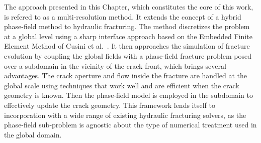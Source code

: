 

The approach presented in this Chapter, which constitutes the core of this work, is refered to as a multi-resolution method. It extends the concept of a hybrid phase-field method \cite{giovanardi2017hybrid, geelen2018optimization, muixi2021combined} to hydraulic fracturing. The method discretizes the problem at a global level using a sharp interface approach based on the Embedded Finite Element Method of Cusini et al.\ \cite{cusini2021simulation}.  It then approaches the simulation of fracture evolution by coupling the global fields with a phase-field fracture problem posed over a subdomain in the vicinity of the crack front, which brings several advantages. The crack aperture and flow inside the fracture are handled at the global scale using techniques that work well and are efficient when the crack geometry is known. Then the phase-field model is employed in the subdomain to effectively update the crack geometry. This framework lends itself to incorporation with a wide range of existing hydraulic fracturing solvers, as the phase-field sub-problem is agnostic about the type of numerical treatment used in the global domain. 

